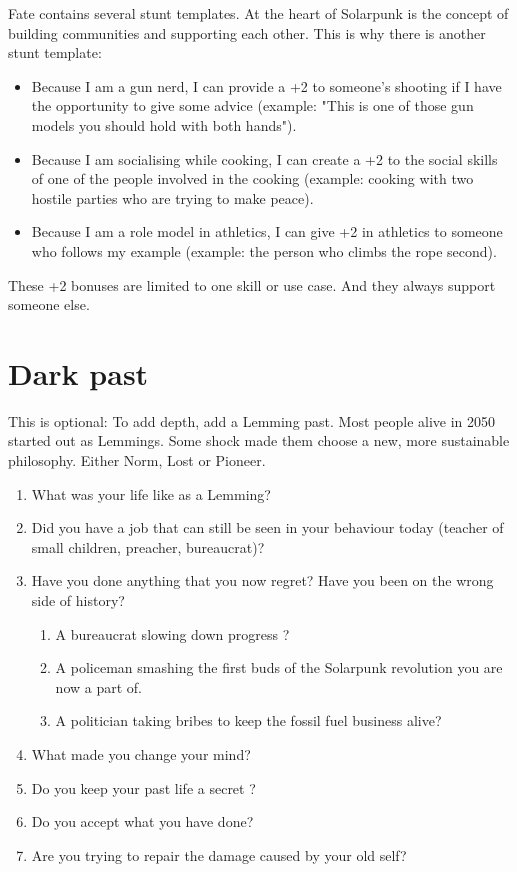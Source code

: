 Fate contains several stunt templates. At the heart of Solarpunk is the concept of building communities and supporting each other. This is why there is another stunt template:

\begin{itemize}
    \item Because I am a gun nerd, I can provide a +2 to someone's shooting if I have the opportunity to give some advice (example: "This is one of those gun models you should hold with both hands").
    \item Because I am socialising while cooking, I can create a +2 to the social skills of one of the people involved in the cooking (example: cooking with two hostile parties who are trying to make peace).
    \item Because I am a role model in athletics, I can give +2 in athletics to someone who follows my example (example: the person who climbs the rope second).
\end{itemize}

These +2 bonuses are limited to one skill or use case. And they always support someone else.


\section{Dark past}

This is optional: To add depth, add a Lemming past. Most people alive in 2050 started out as Lemmings. Some shock made them choose a new, more sustainable philosophy. Either Norm, Lost or Pioneer.

\begin{enumerate}
    \item What was your life like as a Lemming?
    \item Did you have a job that can still be seen in your behaviour today (teacher of small children, preacher, bureaucrat)?
    \item Have you done anything that you now regret? Have you been on the wrong side of history?
    \begin{enumerate}
        \item A bureaucrat slowing down progress ?
        \item A policeman smashing the first buds of the Solarpunk revolution you are now a part of.
        \item A politician taking bribes to keep the fossil fuel business alive?
    \end{enumerate}
    \item What made you change your mind?
    \item Do you keep your past life a secret ?
    \item Do you accept what you have done?
    \item Are you trying to repair the damage caused by your old self?
\end{enumerate}

